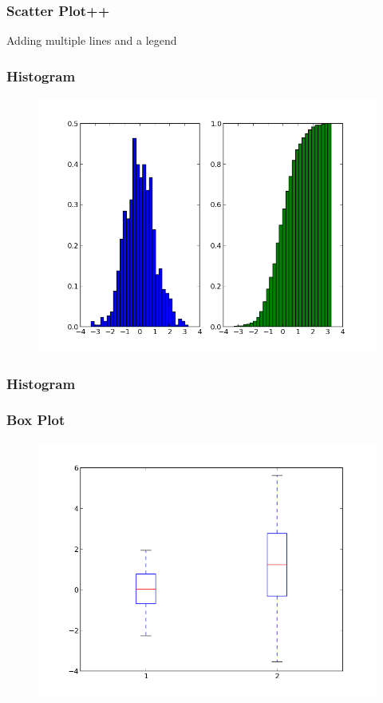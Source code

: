\documentclass{beamer}
\begin{document}
\begin{frame}
\frametitle{Scatter Plot++}
Adding multiple lines and a legend
\lstset{basicstyle=\small}
\end{frame}

\begin{frame}
\frametitle{Histogram}
\begin{figure}[h]
\centering
\includegraphics[width=.9\textwidth]{images/histogram.png}
\end{figure}
\end{frame}

\begin{frame}
\frametitle{Histogram}
\lstset{basicstyle=\small}
\end{frame}


\begin{frame}
\frametitle{Box Plot}
\begin{figure}[h]
\centering
\includegraphics[width=.9\textwidth]{images/boxplot.png}
\end{figure}
\end{frame}
\end{document}
